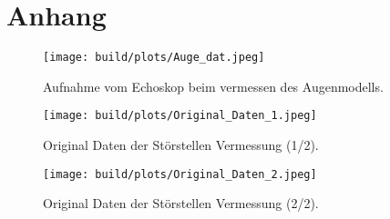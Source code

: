 \section{Anhang}

    \begin{figure}[h]
        \texttt{[image: build/plots/Auge\_dat.jpeg]}
        \caption{Aufnahme vom Echoskop beim vermessen des Augenmodells.}
        \label{img:Auge_dat}
    \end{figure}

    \begin{figure}[h]
        \texttt{[image: build/plots/Original\_Daten\_1.jpeg]}
        \caption{Original Daten der Störstellen Vermessung (1/2).}
    \end{figure}

    \begin{figure}[h]
        \texttt{[image: build/plots/Original\_Daten\_2.jpeg]}
        \caption{Original Daten der Störstellen Vermessung (2/2).}
    \end{figure}
